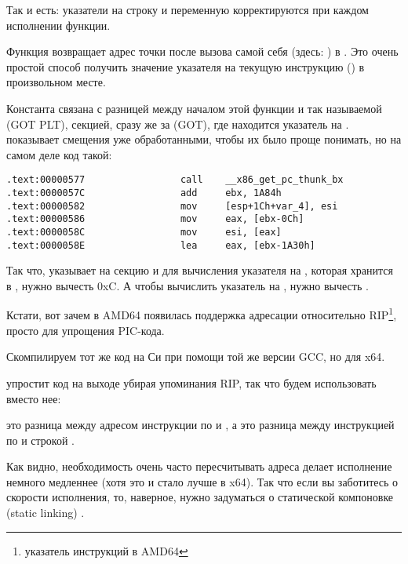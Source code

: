 Так и есть: указатели на строку \retstring{} и переменную \globvar{} корректируются при каждом исполнении функции.

\par Функция  возвращает адрес точки после вызова самой себя (здесь: ) в \EBX.
Это очень простой способ получить значение указателя на текущую инструкцию (\EIP) в произвольном месте.

Константа  связана с разницей между началом этой функции и так называемой
 (GOT PLT), секцией, сразу же за  (GOT), где находится указатель на \globvar{}.
\IDA показывает смещения уже обработанными, чтобы их было проще понимать, но на самом деле код такой:

\begin{lstlisting}[style=customasmx86]
.text:00000577                 call    __x86_get_pc_thunk_bx
.text:0000057C                 add     ebx, 1A84h
.text:00000582                 mov     [esp+1Ch+var_4], esi
.text:00000586                 mov     eax, [ebx-0Ch]
.text:0000058C                 mov     esi, [eax]
.text:0000058E                 lea     eax, [ebx-1A30h]
\end{lstlisting}

Так что, \EBX указывает на секцию  и для вычисления указателя на \globvar{}, которая хранится в , нужно вычесть 0xC.
А чтобы вычислить указатель на \retstring{}, нужно вычесть .

Кстати, вот зачем в AMD64 появилась поддержка адресации относительно RIP\footnote{указатель инструкций в AMD64}, просто для упрощения PIC-кода.

Скомпилируем тот же код на Си при помощи той же версии GCC, но для x64.

\IDA упростит код на выходе убирая упоминания RIP, так что будем использовать  вместо нее:



 это разница между адресом инструкции по  и \globvar{}, 
а  это разница между инструкцией по  и строкой \retstring{}.

Как видно, необходимость очень часто пересчитывать адреса делает исполнение немного медленнее 
(хотя это и стало лучше в x64).
Так что если вы заботитесь о скорости исполнения, то, наверное, нужно задуматься о статической компоновке (static linking)
.


